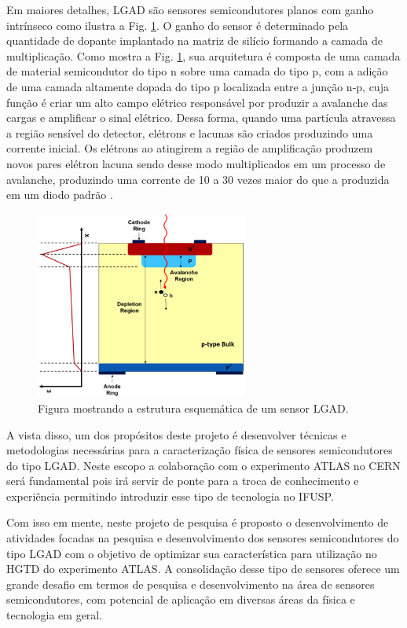 Em maiores detalhes, LGAD são sensores semicondutores planos com ganho intrínseco como ilustra a Fig. \ref{lgad}. O ganho do sensor é determinado pela quantidade de dopante implantado na matriz de silício formando a camada de multiplicação. Como mostra a Fig. \ref{lgad}, sua arquitetura é composta de uma camada de material semicondutor do tipo n sobre uma camada do tipo p, com a adição de uma camada altamente dopada do tipo p localizada entre a junção n-p, cuja função é criar um alto campo elétrico responsável por produzir a avalanche das cargas e amplificar o sinal elétrico. Dessa forma, quando uma partícula atravessa a região sensível do detector, elétrons e lacunas são criados produzindo uma corrente inicial. Os elétrons ao atingirem a região de amplificação produzem novos pares elétron lacuna sendo desse modo multiplicados em um processo de avalanche, produzindo uma corrente de 10 a 30 vezes maior do que a produzida em um diodo padrão \cite{JIN_LGAD,NIMA_LGAD_III}. 

\begin{figure}
    \centering
    \includegraphics[width=7.0cm]{assets/lgad.png}
    \caption{Figura mostrando a estrutura esquemática de um sensor LGAD.}
    \label{lgad}
\end{figure}

A vista disso, um dos propósitos deste projeto é desenvolver técnicas e metodologias necessárias para a caracterização física de sensores semicondutores do tipo LGAD. Neste escopo a colaboração com o experimento ATLAS no CERN será fundamental pois irá servir de ponte para a troca de conhecimento e experiência permitindo introduzir esse tipo de tecnologia no IFUSP.


Com isso em mente, neste projeto de pesquisa é proposto o desenvolvimento de atividades focadas na pesquisa e desenvolvimento dos sensores semicondutores do tipo LGAD com o objetivo de optimizar sua característica para utilização no HGTD do experimento ATLAS. A consolidação desse tipo de sensores oferece um grande desafio em termos de pesquisa e desenvolvimento na área de sensores semicondutores, com potencial de aplicação em diversas áreas da física e tecnologia em geral. 

